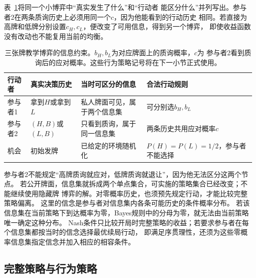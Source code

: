 表~\ref{tab:game-card-information}将同一个小博弈中“真实发生了什么”和“行动者
能区分什么”并列写出。参与者2在两条质询历史上必须用同一个$c$，因为他能看到的行动历史
相同。若直接为高牌和低牌分别设置$c_H,c_L$，便改变了可用信息，得到另一个博弈，
即使收益函数没有改动也不能复用当前的均衡。

\begin{table}[htbp]
  \centering
  \begin{tabularx}{\linewidth}{lXXX}
    \toprule
    行动者 & 真实决策历史 & 当时可区分的信息 & 合法行动规则\\
    \midrule
    参与者1 & 拿到$H$或拿到$L$ & 私人牌面可见，属于两个信息集 & 可分别选$b_H,b_L$\\
    参与者2 & $(H,B)$或$(L,B)$ & 只看到质询，属于同一信息集 & 两条历史共用应对概率$c$\\
    机会 & 初始发牌 & 已给定的环境随机化 & $P(H)=P(L)=1/2$，参与者不能选择\\
    \bottomrule
  \end{tabularx}
  \caption{三张牌教学博弈的信息约束。$b_H,b_L$为对应牌面上的质询概率，$c$为
  参与者2看到质询后的应对概率。这些行为策略记号将在下一小节正式使用。}
  \label{tab:game-card-information}
\end{table}

参与者2不能规定“高牌质询就应对，低牌质询就退让”，因为他无法区分这两个节点。
若公开牌面，信息集就拆成两个单点集合，可实施的策略集合已经改变；不能继续使用隐藏牌
博弈的解。对零概率历史，也须预先规定行动，才能比较完整策略偏离。
这里的信念是参与者对信息集内各条可能历史的条件概率分布。
若该信息集在当前策略下到达概率为零，Bayes规则中的分母为零，就无法由当前策略唯一确定这种分布。
Nash条件只比较开局时完整策略的收益；若要求参与者在每个信息集都按当时的信念选择最优续局行动，
即满足序贯理性，还须为这些零概率信息集指定信念并加入相应的相容条件。

\subsection{完整策略与行为策略}
\label{sec:game-complete-behavior}

